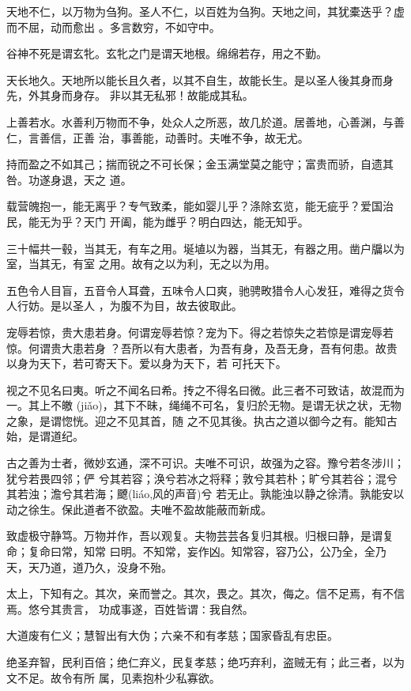 \documentclass[a4paper, twoside, openany, extrafontsizes]{dlutthesis}
\begin{document}
天地不仁，以万物为刍狗。圣人不仁，以百姓为刍狗。天地之间，其犹橐迭乎？虚而不屈，动而愈出
。多言数穷，不如守中。

谷神不死是谓玄牝。玄牝之门是谓天地根。绵绵若存，用之不勤。

天长地久。天地所以能长且久者，以其不自生，故能长生。是以圣人後其身而身先，外其身而身存。
非以其无私邪！故能成其私。

上善若水。水善利万物而不争，处众人之所恶，故几於道。居善地，心善渊，与善仁，言善信，正善
治，事善能，动善时。夫唯不争，故无尤。

持而盈之不如其己；揣而锐之不可长保；金玉满堂莫之能守；富贵而骄，自遗其咎。功遂身退，天之
道。

载营魄抱一，能无离乎？专气致柔，能如婴儿乎？涤除玄览，能无疵乎？爱国治民，能无为乎？天门
开阖，能为雌乎？明白四达，能无知乎。

三十幅共一毂，当其无，有车之用。埏埴以为器，当其无，有器之用。凿户牖以为室，当其无，有室
之用。故有之以为利，无之以为用。

五色令人目盲，五音令人耳聋，五味令人口爽，驰骋畋猎令人心发狂，难得之货令人行妨。是以圣人
，为腹不为目，故去彼取此。

宠辱若惊，贵大患若身。何谓宠辱若惊？宠为下。得之若惊失之若惊是谓宠辱若惊。何谓贵大患若身
？吾所以有大患者，为吾有身，及吾无身，吾有何患。故贵以身为天下，若可寄天下。爱以身为天下，若
可托天下。

视之不见名曰夷。听之不闻名曰希。抟之不得名曰微。此三者不可致诘，故混而为一。其上不皦
(jiǎo)，其下不昧，绳绳不可名，复归於无物。是谓无状之状，无物之象，是谓惚恍。迎之不见其首，随
之不见其後。执古之道以御今之有。能知古始，是谓道纪。

古之善为士者，微妙玄通，深不可识。夫唯不可识，故强为之容。豫兮若冬涉川；犹兮若畏四邻；俨
兮其若容；涣兮若冰之将释；敦兮其若朴；旷兮其若谷；混兮其若浊；澹兮其若海；飉(liáo,风的声音)兮
若无止。孰能浊以静之徐清。孰能安以动之徐生。保此道者不欲盈。夫唯不盈故能蔽而新成。

致虚极守静笃。万物并作，吾以观复。夫物芸芸各复归其根。归根曰静，是谓复命；复命曰常，知常
曰明。不知常，妄作凶。知常容，容乃公，公乃全，全乃天，天乃道，道乃久，没身不殆。

太上，下知有之。其次，亲而誉之。其次，畏之。其次，侮之。信不足焉，有不信焉。悠兮其贵言，
功成事遂，百姓皆谓∶我自然。

大道废有仁义；慧智出有大伪；六亲不和有孝慈；国家昏乱有忠臣。

绝圣弃智，民利百倍；绝仁弃义，民复孝慈；绝巧弃利，盗贼无有；此三者，以为文不足。故令有所
属，见素抱朴少私寡欲。
\end{document}
